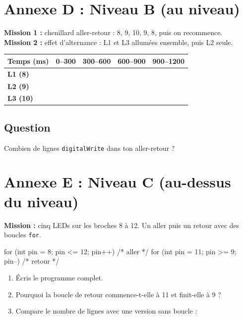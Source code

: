 \documentclass[11pt,a4paper]{article}
\begin{document}
\newpage
\section*{Annexe D : Niveau B (au niveau)}

\textbf{Mission 1 :} chenillard aller-retour : 8, 9, 10, 9, 8, puis on recommence.\\
\textbf{Mission 2 :} effet d'alternance : L1 et L3 allumées ensemble, puis L2 seule.

\begin{tabularx}{\linewidth}{>{\bfseries}p{2.4cm}Y Y Y Y}
\toprule
Temps (ms) & 0--300 & 300--600 & 600--900 & 900--1200\\
\midrule
L1 (8) & & & & \\
L2 (9) & & & & \\
L3 (10) & & & & \\
\bottomrule
\end{tabularx}

\subsection*{Question}
Combien de lignes \texttt{digitalWrite} dans ton aller-retour ? \dotfill

\newpage
\section*{Annexe E : Niveau C (au-dessus du niveau)}

\textbf{Mission :} cinq LEDs sur les broches 8 à 12. Un aller puis un retour avec des boucles \texttt{for}.

\begin{arduino}
for (int pin = 8; pin <= 12; pin++) { /* aller */ }
for (int pin = 11; pin >= 9; pin--) { /* retour */ }
\end{arduino}

\begin{enumerate}
 \item Écris le programme complet.\\ \lig \lig \lig
 \item Pourquoi la boucle de retour commence-t-elle à 11 et finit-elle à 9 ? \dotfill
 \item Compare le nombre de lignes avec une version sans boucle : \dotfill
\end{enumerate}
\end{document}
